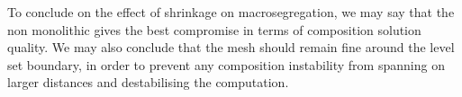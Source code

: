 To conclude on the effect of shrinkage on macrosegregation, we may say that the non monolithic gives the best compromise in terms of composition solution
quality. We may also conclude that the mesh should remain fine around the level set boundary, in order to prevent any composition instability from spanning
on larger distances and destabilising the computation.


